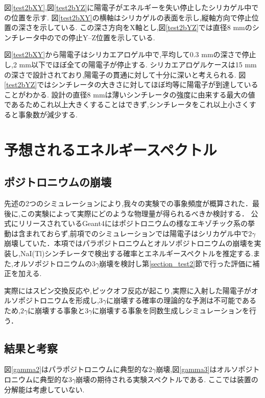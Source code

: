 図\ref{test2bXY},図\ref{test2bYZ}に陽電子がエネルギーを失い停止したシリカゲル中での位置を示す.
図\ref{test2bXY}の横軸はシリカゲルの表面を示し,縦軸方向で停止位置の深さを示している.
この深さ方向をX軸とし,図\ref{test2bYZ}では直径8 mmのシンチレータ中のでの停止Y--Z位置を示している.

図\ref{test2bXY}から陽電子はシリカエアロゲル中で,平均して0.3 mmの深さで停止し,2 mm以下でほぼ全ての陽電子が停止する.
シリカエアロゲルケースは15 mmの深さで設計されており,陽電子の貫通に対して十分に深いと考えられる.
図\ref{test2bYZ}ではシンチレータの大きさに対してほぼ均等に陽電子が到達していることがわかる.
設計の直径8 mmは薄いシンチレータの強度に由来する最大の値であるためこれ以上大きくすることはできず,シンチレータをこれ以上小さくすると事象数が減少する.


\section{予想されるエネルギースペクトル}
\label{section_test3}

\subsection{ポジトロニウムの崩壊}

先述の2つのシミュレーションにより,我々の実験での事象頻度が概算された．最後に,この実験によって実際にどのような物理量が得られるべきか検討する．
公式にリリースされているGeant4にはポジトロニウムの様なエキゾチック系の挙動は含まれておらず,前項でのシミュレーションでは陽電子はシリカゲル中で$2\gamma$崩壊していた．本項ではパラポジトロニウムとオルソポジトロニウムの崩壊を実装し,NaI(Tl)シンチレータで検出する確率とエネルギースペクトルを推定する.また,オルソポジトロニウムの$3\gamma$崩壊を検討し第\ref{section_test2}節で行った評価に補正を加える.

実際にはスピン交換反応や,ピックオフ反応が起こり,実際に入射した陽電子がオルソポジトロニウムを形成し,$3\gamma$に崩壊する確率の理論的な予測は不可能であるため,$2\gamma$に崩壊する事象と$3\gamma$に崩壊する事象を同数生成しシミュレーションを行う．

\subsection{結果と考察}

図\ref{gamma2}はパラポジトロニウムに典型的な$2\gamma$崩壊,図\ref{gamma3}はオルソポジトロニウムに典型的な$3\gamma$崩壊の期待される実験スペクトルである.
ここでは装置の分解能は考慮していない.

